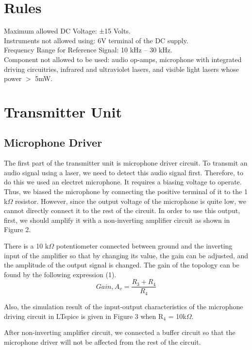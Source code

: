 \documentclass[conference]{IEEEtran}
\begin{document}
\section{Rules}
\noindent Maximum allowed DC Voltage: ±15 Volts. \\
Instruments not allowed using: 6V terminal of the DC supply.\\ 
Frequency Range for Reference Signal: 10 kHz – 30 kHz. \\
Component not allowed to be used: audio op-amps, microphone with integrated driving circuitries, infrared and ultraviolet lasers, and visible light lasers whose power \(>\) 5mW.
\section{Transmitter Unit}
\subsection{Microphone Driver}
The first part of the transmitter unit is microphone driver circuit. To transmit an audio signal using a laser, we need to detect this audio signal first. Therefore, to do this we used an electret microphone. It requires a biasing voltage to operate. Thus, we biased the microphone by connecting the positive terminal of it to the 1 k\(\Omega\) resistor. However, since the output voltage of the microphone is quite low, we cannot directly connect it to the rest of the circuit. In order to use this output, first, we should amplify it with a non-inverting amplifier circuit as shown in Figure 2. \\ \par
There is a 10 k\(\Omega\) potentiometer connected between ground and the inverting input of the amplifier so that by changing its value, the gain can be adjusted, and the amplitude of the output signal is changed. The gain of the topology can be found by the following expression (1).
\begin{equation}\label{eq:1}
        Gain, A_v = \frac{R_3+R_4}{R_4} 
 \end{equation}
\par Also, the simulation result of the input-output characteristics of the microphone driving circuit in LTspice is given in Figure 3 when R\(_4\) = 10k\(\Omega\). \\ \par
After non-inverting amplifier circuit, we connected a buffer circuit so that the microphone driver will not be affected from the rest of the circuit. 
\end{document}
